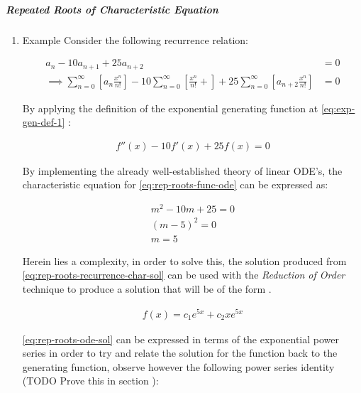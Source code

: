 \documentclass[11pt]{article}
\begin{document}
\subparagraph{Repeated Roots of Characteristic Equation}
\label{rep-roots-recurrence}
\begin{enumerate}
\item Example
\label{sec:org8618087}
Consider the following recurrence relation:

\begin{align}
    a_n -  10a_{n+ 1} +  25a_{n+  2}&= 0 \label{eq:hom-repeated-roots-recurrence} \\
    \implies  \sum^{\infty}_{n= 0}   {\left[{ a_n \frac{x^n}{n!} }\right]} - 10 \sum^{\infty}_{n= 0}   {\left[{ \frac{x^n}{n!}+    }\right]} + 25 \sum^{\infty}_{n= 0 }   {\left[{  a_{n+  2 }\frac{x^n}{n!} }\right]}&= 0 \nonumber
\end{align}

By applying the definition of the exponential generating function at \eqref{eq:exp-gen-def-1} :

\begin{align}
    f''{\left({ x }\right)}- 10f'{\left({ x }\right)}+  25f{\left({ x }\right)}= 0 \nonumber \label{eq:rep-roots-func-ode}
\end{align}

By implementing the already well-established theory of linear ODE's, the characteristic equation for \eqref{eq:rep-roots-func-ode} can be expressed as:

\begin{align}
    m^2- 10m+  25 = 0 \nonumber \\
    {\left({ m- 5 }\right)}^2 = 0 \nonumber \\
    m= 5 \label{eq:rep-roots-recurrence-char-sol}
\end{align}

Herein lies a complexity, in order to solve this, the solution produced from \eqref{eq:rep-roots-recurrence-char-sol} can be used with the \emph{Reduction of Order} technique to produce a solution that will be of the form \cite[]{zillMatrixExponential2009}.

\begin{align}
    f{\left({ x }\right)}= c_1e^{5x} +  c_2 x e^{5x} \label{eq:rep-roots-ode-sol}
\end{align}

\eqref{eq:rep-roots-ode-sol} can be expressed in terms of the exponential power series in order to try and relate the solution for the function back to the generating function,
observe however the following power series identity (TODO Prove this in section ):


\end{enumerate}
\end{document}
